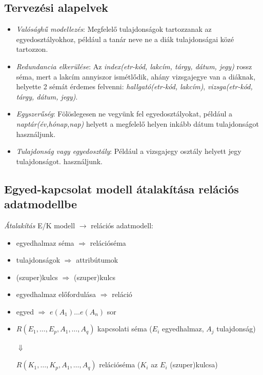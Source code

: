 \documentclass[tikz,12pt,margin=0px]{article}
\begin{document}
    \subsection*{Tervezési alapelvek}

	\begin{itemize}
		\item \emph{Valósághű modellezés}: Megfelelő tulajdonságok tartozzanak az egyedosztályokhoz, például a tanár neve ne a diák tulajdonságai közé tartozzon.
        \item \emph{Redundancia elkerülése}: Az \textit{index(etr-kód, lakcím, tárgy, dátum, jegy)} rossz séma, mert a lakcím annyiszor ismétlődik, ahány vizsgajegye van a diáknak, helyette 2 sémát érdemes felvenni: \textit{hallgató(etr-kód, lakcím)}, \textit{vizsga(etr-kód, tárgy, dátum, jegy)}.
        \item \emph{Egyszerűség}: Fölöslegesen ne vegyünk fel egyedosztályokat, például a \textit{naptár(év,hónap,nap)} helyett a megfelelő helyen inkább dátum tulajdonságot használjunk.
		\item \emph{Tulajdonság vagy egyedosztály}: Például a vizsgajegy osztály helyett jegy tulajdonságot.
		használjunk.
	\end{itemize}
	
	\subsection*{Egyed-kapcsolat modell átalakítása relációs adatmodellbe}
	
	\noindent \textit{Átalakítás} E/K modell $\to$ relációs adatmodell:
	\begin{itemize}
		\item egyedhalmaz séma $\Rightarrow$ relációséma
		\item tulajdonságok $\Rightarrow$ attribútumok
		\item (szuper)kulcs $\Rightarrow$ (szuper)kulcs
		\item egyedhalmaz előfordulása $\Rightarrow$ reláció
		\item egyed $\Rightarrow$ $e(A_1) \ldots e(A_n)$ sor
		\item $R(E_1,\ldots, E_p, A_1, \ldots, A_q)$ kapcsolati séma ($E_i$ egyedhalmaz, $A_j$ tulajdonság)
        \begin{center}
            $\Downarrow$\\
        \end{center}
        $R(K_1,\ldots, K_p, A_1,\ldots, A_q)$ relációséma ($K_i$ az $E_i$ (szuper)kulcsa)\\
	\end{itemize}
\end{document}
